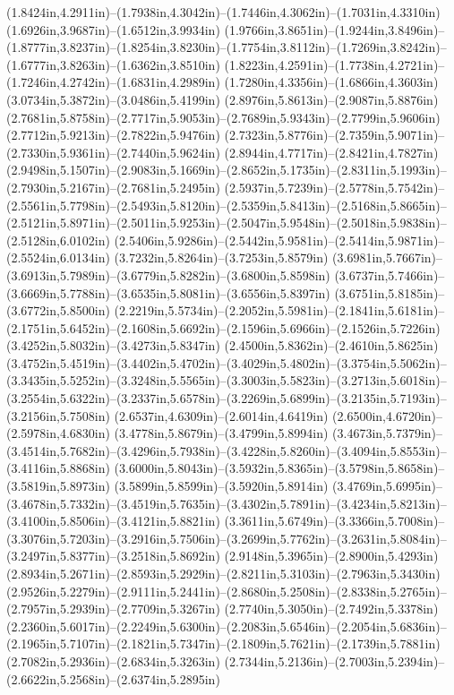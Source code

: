 (1.8424in,4.2911in)--(1.7938in,4.3042in)--(1.7446in,4.3062in)--(1.7031in,4.3310in) (1.6926in,3.9687in)--(1.6512in,3.9934in) (1.9766in,3.8651in)--(1.9244in,3.8496in)--(1.8777in,3.8237in)--(1.8254in,3.8230in)--(1.7754in,3.8112in)--(1.7269in,3.8242in)--(1.6777in,3.8263in)--(1.6362in,3.8510in) (1.8223in,4.2591in)--(1.7738in,4.2721in)--(1.7246in,4.2742in)--(1.6831in,4.2989in) (1.7280in,4.3356in)--(1.6866in,4.3603in) (3.0734in,5.3872in)--(3.0486in,5.4199in) (2.8976in,5.8613in)--(2.9087in,5.8876in) (2.7681in,5.8758in)--(2.7717in,5.9053in)--(2.7689in,5.9343in)--(2.7799in,5.9606in) (2.7712in,5.9213in)--(2.7822in,5.9476in) (2.7323in,5.8776in)--(2.7359in,5.9071in)--(2.7330in,5.9361in)--(2.7440in,5.9624in) (2.8944in,4.7717in)--(2.8421in,4.7827in) (2.9498in,5.1507in)--(2.9083in,5.1669in)--(2.8652in,5.1735in)--(2.8311in,5.1993in)--(2.7930in,5.2167in)--(2.7681in,5.2495in) (2.5937in,5.7239in)--(2.5778in,5.7542in)--(2.5561in,5.7798in)--(2.5493in,5.8120in)--(2.5359in,5.8413in)--(2.5168in,5.8665in)--(2.5121in,5.8971in)--(2.5011in,5.9253in)--(2.5047in,5.9548in)--(2.5018in,5.9838in)--(2.5128in,6.0102in) (2.5406in,5.9286in)--(2.5442in,5.9581in)--(2.5414in,5.9871in)--(2.5524in,6.0134in) (3.7232in,5.8264in)--(3.7253in,5.8579in) (3.6981in,5.7667in)--(3.6913in,5.7989in)--(3.6779in,5.8282in)--(3.6800in,5.8598in) (3.6737in,5.7466in)--(3.6669in,5.7788in)--(3.6535in,5.8081in)--(3.6556in,5.8397in) (3.6751in,5.8185in)--(3.6772in,5.8500in) (2.2219in,5.5734in)--(2.2052in,5.5981in)--(2.1841in,5.6181in)--(2.1751in,5.6452in)--(2.1608in,5.6692in)--(2.1596in,5.6966in)--(2.1526in,5.7226in) (3.4252in,5.8032in)--(3.4273in,5.8347in) (2.4500in,5.8362in)--(2.4610in,5.8625in) (3.4752in,5.4519in)--(3.4402in,5.4702in)--(3.4029in,5.4802in)--(3.3754in,5.5062in)--(3.3435in,5.5252in)--(3.3248in,5.5565in)--(3.3003in,5.5823in)--(3.2713in,5.6018in)--(3.2554in,5.6322in)--(3.2337in,5.6578in)--(3.2269in,5.6899in)--(3.2135in,5.7193in)--(3.2156in,5.7508in) (2.6537in,4.6309in)--(2.6014in,4.6419in) (2.6500in,4.6720in)--(2.5978in,4.6830in) (3.4778in,5.8679in)--(3.4799in,5.8994in) (3.4673in,5.7379in)--(3.4514in,5.7682in)--(3.4296in,5.7938in)--(3.4228in,5.8260in)--(3.4094in,5.8553in)--(3.4116in,5.8868in) (3.6000in,5.8043in)--(3.5932in,5.8365in)--(3.5798in,5.8658in)--(3.5819in,5.8973in) (3.5899in,5.8599in)--(3.5920in,5.8914in) (3.4769in,5.6995in)--(3.4678in,5.7332in)--(3.4519in,5.7635in)--(3.4302in,5.7891in)--(3.4234in,5.8213in)--(3.4100in,5.8506in)--(3.4121in,5.8821in) (3.3611in,5.6749in)--(3.3366in,5.7008in)--(3.3076in,5.7203in)--(3.2916in,5.7506in)--(3.2699in,5.7762in)--(3.2631in,5.8084in)--(3.2497in,5.8377in)--(3.2518in,5.8692in) (2.9148in,5.3965in)--(2.8900in,5.4293in) (2.8934in,5.2671in)--(2.8593in,5.2929in)--(2.8211in,5.3103in)--(2.7963in,5.3430in) (2.9526in,5.2279in)--(2.9111in,5.2441in)--(2.8680in,5.2508in)--(2.8338in,5.2765in)--(2.7957in,5.2939in)--(2.7709in,5.3267in) (2.7740in,5.3050in)--(2.7492in,5.3378in) (2.2360in,5.6017in)--(2.2249in,5.6300in)--(2.2083in,5.6546in)--(2.2054in,5.6836in)--(2.1965in,5.7107in)--(2.1821in,5.7347in)--(2.1809in,5.7621in)--(2.1739in,5.7881in) (2.7082in,5.2936in)--(2.6834in,5.3263in) (2.7344in,5.2136in)--(2.7003in,5.2394in)--(2.6622in,5.2568in)--(2.6374in,5.2895in) 